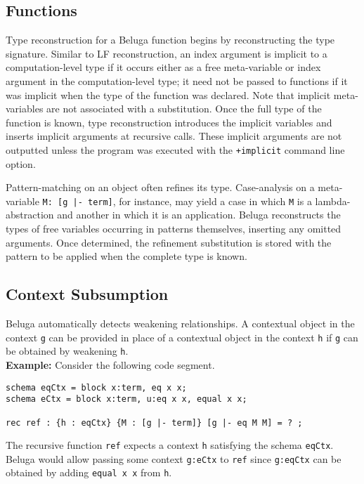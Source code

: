 \documentclass[11pt]{article}
\begin{document}
\subsection{Functions}
Type reconstruction for a Beluga function begins by reconstructing the type signature. Similar to LF reconstruction, an index argument is implicit to a computation-level type if it occurs either as a free meta-variable or index argument in the computation-level type; it need not be passed to functions if it was implicit when the type of the function was declared. Note that implicit meta-variables are not associated with a substitution. Once the full type of the function is known, type reconstruction introduces the implicit variables and inserts implicit arguments at recursive calls. These implicit arguments are not outputted unless the program was executed with the \texttt{+implicit} command line option.

Pattern-matching on an object often refines its type. Case-analysis on a meta-variable \texttt{M: [g |- term]}, for instance, may yield a case in which \texttt{M} is a lambda-abstraction and another in which it is an application. Beluga reconstructs the types of free variables occurring in patterns themselves, inserting any omitted arguments. Once determined, the refinement substitution is stored with the pattern to be applied when the complete type is known.

\subsection{Context Subsumption}
Beluga automatically detects weakening relationships. A contextual object in the context \texttt{g} can be provided in place of a contextual object in the context \texttt{h} if \texttt{g} can be obtained by weakening \texttt{h}. \\

\textbf{Example:} Consider the following code segment.
\begin{verbatim}
schema eqCtx = block x:term, eq x x;
schema eCtx = block x:term, u:eq x x, equal x x;

rec ref : {h : eqCtx} {M : [g |- term]} [g |- eq M M] = ? ;
\end{verbatim}
The recursive function \texttt{ref} expects a context \texttt{h} satisfying the schema \texttt{eqCtx}. Beluga would allow passing some context \texttt{g:eCtx} to \texttt{ref} since \texttt{g:eqCtx} can be obtained by adding \texttt{equal x x} from \texttt{h}.
\end{document}
